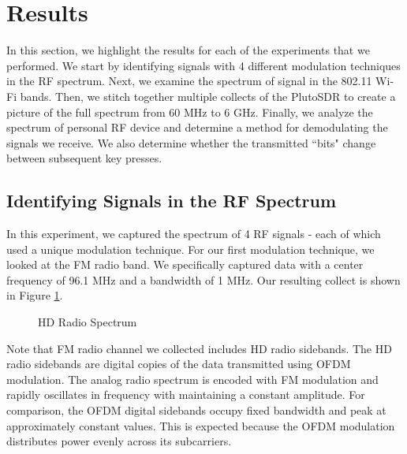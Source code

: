 \documentclass{article}
\begin{document}
\section{Results}

In this section, we highlight the results for each of the experiments that we performed. We start by identifying signals with 4 different modulation techniques in the RF spectrum. Next, we examine the spectrum of signal in the 802.11 Wi-Fi bands. Then, we stitch together multiple collects of the PlutoSDR to create a picture of the full spectrum from 60 MHz to 6 GHz. Finally, we analyze the spectrum of personal RF device and determine a method for demodulating the signals we receive. We also determine whether the transmitted ``bits" change between subsequent key presses.


\subsection{Identifying Signals in the RF Spectrum}

In this experiment, we captured the spectrum of 4 RF signals - each of which used a unique modulation technique. For our first modulation technique, we looked at the FM radio band. We specifically captured data with a center frequency of 96.1 MHz and a bandwidth of 1 MHz. Our resulting collect is shown in Figure \ref{fig::hd_radio_spectrum}.

\begin{figure}[H]
	\centerline{}
	\caption{HD Radio Spectrum}
	\label{fig::hd_radio_spectrum}
\end{figure}


Note that FM radio channel we collected includes HD radio sidebands. The HD radio sidebands are digital copies of the data transmitted using OFDM modulation. The analog radio spectrum is encoded with FM modulation and rapidly oscillates in frequency with maintaining a constant amplitude. For comparison, the OFDM digital sidebands occupy fixed bandwidth and peak at approximately constant values. This is expected because the OFDM modulation distributes power evenly across its subcarriers.
\end{document}
